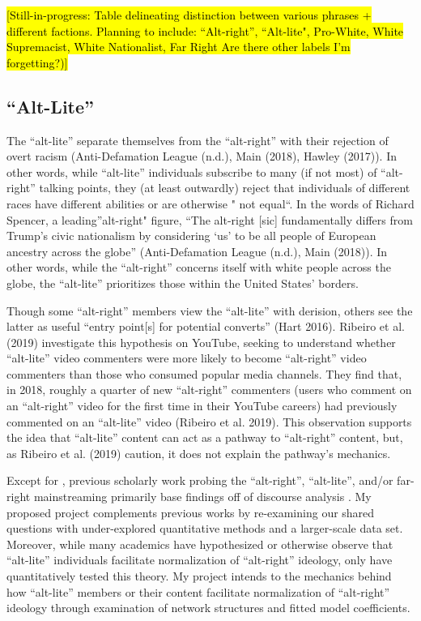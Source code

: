 \documentclass[acmlarge, screen, authorversion]{acmart}
\begin{document}
\medskip

\hl{[Still-in-progress: Table delineating distinction between various phrases + different factions. 
Planning to include: ``Alt-right'', ``Alt-lite", Pro-White, White Supremacist, White Nationalist, Far Right
Are there other labels I'm forgetting?)]}

\medskip

\subsection{“Alt-Lite”}

The “alt-lite” separate themselves from the “alt-right” with their
rejection of overt racism (Anti-Defamation League (n.d.), Main (2018),
Hawley (2017)). In other words, while “alt-lite” individuals subscribe
to many (if not most) of “alt-right” talking points, they (at least
outwardly) reject that individuals of different races have different
abilities or are otherwise " not equal“. In the words of Richard
Spencer, a leading”alt-right" figure, “The alt-right [sic] fundamentally
differs from Trump’s civic nationalism by considering ‘us’ to be all
people of European ancestry across the globe” (Anti-Defamation League
(n.d.), Main (2018)). In other words, while the “alt-right” concerns
itself with white people across the globe, the “alt-lite” prioritizes
those within the United States’ borders.

Though some “alt-right” members view the “alt-lite” with derision,
others see the latter as useful “entry point[s] for potential converts”
(Hart 2016). Ribeiro et al. (2019) investigate this hypothesis on
YouTube, seeking to understand whether “alt-lite” video commenters were
more likely to become “alt-right” video commenters than those who
consumed popular media channels. They find that, in 2018, roughly a
quarter of new “alt-right” commenters (users who comment on an
“alt-right” video for the first time in their YouTube careers) had
previously commented on an “alt-lite” video (Ribeiro et al. 2019). This
observation supports the idea that “alt-lite” content can act as a
pathway to “alt-right” content, but, as Ribeiro et al. (2019) caution,
it does not explain the pathway’s mechanics.

Except for \citet{ribeiroAuditingRadicalizationPathways2019}, previous scholarly work probing the
“alt-right”, “alt-lite”, and/or far-right mainstreaming
primarily base findings off of discourse analysis \cite{cammaertsMainstreamingExtremeRightWing2018, gallaherMainstreamingWhiteSupremacy2020, lorenzo-dusDiscourseUSAltright2020, fergusWhitegenocideAltrightConspiracy2019}. My proposed project
complements previous works by re-examining our shared questions with
under-explored quantitative methods and a larger-scale data set. Moreover,
while many academics \cite{sternProudBoysWhite2019, nagleKillAllNormies2017, mainRiseAltRight2018} have hypothesized or otherwise observe that “alt-lite”
individuals facilitate normalization of “alt-right” ideology, only
\citet{ribeiroAuditingRadicalizationPathways2019} have quantitatively tested this theory. My
project intends to the mechanics behind how “alt-lite” members or their
content facilitate normalization of “alt-right” ideology through
examination of network structures and fitted model coefficients.
\end{document}

